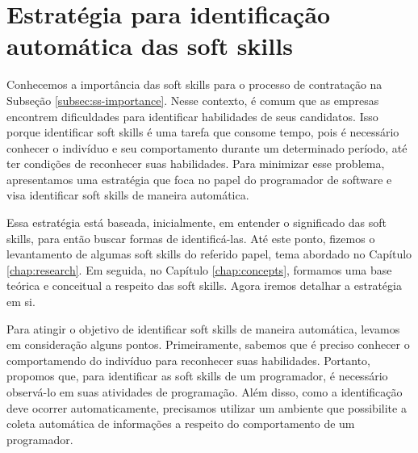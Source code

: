 

\chapter{Estratégia para identificação automática das soft skills}

\label{chap:metrics}

Conhecemos a importância das soft skills para o processo de contratação na Subseção \ref{subsec:ss-importance}. Nesse contexto, é comum que as empresas encontrem dificuldades para identificar habilidades de seus candidatos. Isso porque identificar soft skills é uma tarefa que consome tempo, pois é necessário conhecer o indivíduo e seu comportamento durante um determinado período, até ter condições de reconhecer suas habilidades. Para minimizar esse problema, apresentamos uma estratégia que foca no papel do programador de software e visa identificar soft skills de maneira automática.




Essa estratégia está baseada, inicialmente, em entender o significado das soft skills, para então buscar formas de identificá-las.
Até este ponto, fizemos o levantamento de algumas soft skills do referido papel, tema abordado no Capítulo \ref{chap:research}. Em seguida, no Capítulo \ref{chap:concepts}, formamos uma base teórica e conceitual a respeito das soft skills.
Agora iremos detalhar a estratégia em si.

Para atingir o objetivo de identificar soft skills de maneira automática, levamos em consideração alguns pontos. Primeiramente, sabemos que é preciso conhecer o comportamendo do indivíduo para reconhecer suas habilidades. Portanto, propomos que, para identificar as soft skills de um programador, é necessário observá-lo em suas atividades de programação. Além disso, como a identificação deve ocorrer automaticamente, precisamos utilizar um ambiente que possibilite a coleta automática de informações a respeito do comportamento de um programador.

